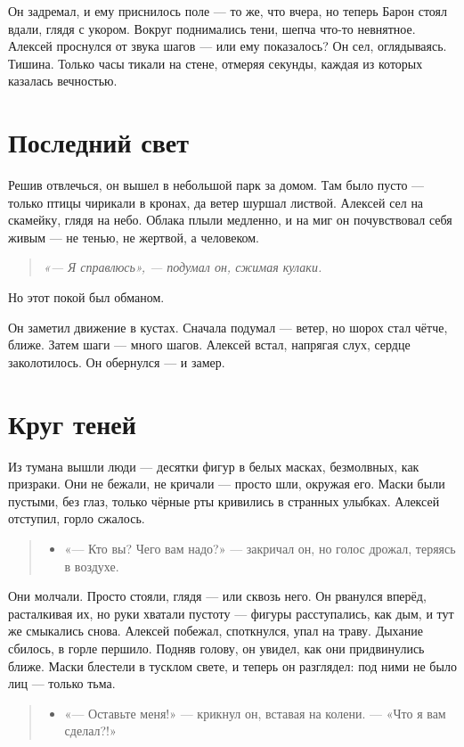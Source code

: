\documentclass[12pt,a4paper]{book}
\newenvironment{dialogue}{\begin{quote}\itshape\begin{itemize}\item[]}{\end{itemize}\end{quote}}
\newenvironment{innerthought}{\begin{quote}\small\itshape}{\end{quote}}
\begin{document}
Он задремал, и ему приснилось поле — то же, что вчера, но теперь Барон стоял вдали, глядя с укором. Вокруг поднимались тени, шепча что-то невнятное. Алексей проснулся от звука шагов — или ему показалось? Он сел, оглядываясь. Тишина. Только часы тикали на стене, отмеряя секунды, каждая из которых казалась вечностью.

\section{Последний свет}

Решив отвлечься, он вышел в небольшой парк за домом. Там было пусто — только птицы чирикали в кронах, да ветер шуршал листвой. Алексей сел на скамейку, глядя на небо. Облака плыли медленно, и на миг он почувствовал себя живым — не тенью, не жертвой, а человеком.

\begin{innerthought}
«— Я справлюсь», — подумал он, сжимая кулаки.
\end{innerthought}

Но этот покой был обманом.

Он заметил движение в кустах. Сначала подумал — ветер, но шорох стал чётче, ближе. Затем шаги — много шагов. Алексей встал, напрягая слух, сердце заколотилось. Он обернулся — и замер.

\section{Круг теней}

Из тумана вышли люди — десятки фигур в белых масках, безмолвных, как призраки. Они не бежали, не кричали — просто шли, окружая его. Маски были пустыми, без глаз, только чёрные рты кривились в странных улыбках. Алексей отступил, горло сжалось.

\begin{dialogue}
«— Кто вы? Чего вам надо?» — закричал он, но голос дрожал, теряясь в воздухе.
\end{dialogue}

Они молчали. Просто стояли, глядя — или сквозь него. Он рванулся вперёд, расталкивая их, но руки хватали пустоту — фигуры расступались, как дым, и тут же смыкались снова. Алексей побежал, споткнулся, упал на траву. Дыхание сбилось, в горле першило. Подняв голову, он увидел, как они придвинулись ближе. Маски блестели в тусклом свете, и теперь он разглядел: под ними не было лиц — только тьма.

\begin{dialogue}
«— Оставьте меня!» — крикнул он, вставая на колени. — «Что я вам сделал?!»
\end{dialogue}
\end{document}
